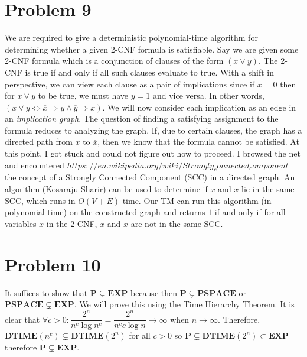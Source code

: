 \documentclass[usletter]{article}
\begin{document}
\newpage

\section*{Problem 9}
We are required to give a deterministic polynomial-time algorithm for determining whether a given 2-CNF
formula is satisfiable. Say we are given some 2-CNF formula which is a conjunction of clauses of the form \((x \lor y)\). The 2-CNF
is true if and only if all such clauses evaluate to true. With a shift in perspective, we can view each clause as a pair of implications
since if \(x = 0\) then for \(x\lor y\) to be true, we must have \(y = 1\) and vice versa. In other words, \((x\lor y \iff \overline{x} 
\Rightarrow y \land \overline{y} \Rightarrow x)\). We will now consider each implication as an edge in an \emph{implication graph}. The question
of finding a satisfying assignment to the formula reduces to analyzing the graph. If, due to certain clauses, the graph has a directed path from \(x\) to
\(\overline{x}\), then we know that the formula cannot be satisfied. At this point, I got stuck and could not figure out how to proceed. I browsed the net and encountered \(https://en.wikipedia.org/wiki/Strongly_connected_component\)
the concept of a Strongly Connected Component (SCC) in a directed graph. An algorithm (Kosaraju-Sharir) can be used to determine if \(x\) and \(\overline{x}\) lie in the same SCC, which runs in \(O(V + E)\) time.
Our TM can run this algorithm (in polynomial time) on the constructed graph and returns \(1\) if and only if for all variables \(x\) in the 2-CNF, \(x\) and \(\overline{x}\) are not in the same SCC. 

\newpage

\section*{Problem 10}
It suffices to show that \(\mathbf{P} \subsetneq \mathbf{EXP}\) because then \(\mathbf{P} \subsetneq \mathbf{PSPACE}\) or \(\mathbf{PSPACE} \subsetneq \mathbf{EXP}\). 
We will prove this using the Time Hierarchy Theorem. It is clear that \(\forall c > 0: \dfrac{2^n}{n^c\log n^c} = \dfrac{2^n}{n^c c \log n} \rightarrow \infty\) when \(n \rightarrow \infty\). Therefore,
\(\mathbf{DTIME}(n^c) \subsetneq \mathbf{DTIME}(2^n)\) for all \(c > 0\) so \(\mathbf{P} \subsetneq \mathbf{DTIME}(2^n) \subset \mathbf{EXP}\) therefore 
\(\mathbf{P} \subsetneq \mathbf{EXP}\).
\newpage
\end{document}
